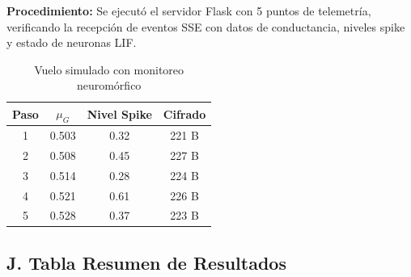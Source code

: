 \textbf{Procedimiento:} Se ejecutó el servidor Flask con 5 puntos de telemetría, verificando la recepción de eventos SSE con datos de conductancia, niveles spike y estado de neuronas LIF.

\begin{table}[H]
    \centering\footnotesize\setlength{\tabcolsep}{3pt}
    \caption{Vuelo simulado con monitoreo neuromórfico}
    \label{tab:flight-neuro}
    \begin{tabular}{|c|c|c|c|}
        \hline
        \textbf{Paso} & \textbf{$\mu_G$} & \textbf{Nivel Spike} & \textbf{Cifrado} \\
        \hline
        1 & 0.503 & 0.32 & 221 B \\
        2 & 0.508 & 0.45 & 227 B \\
        3 & 0.514 & 0.28 & 224 B \\
        4 & 0.521 & 0.61 & 226 B \\
        5 & 0.528 & 0.37 & 223 B \\
        \hline
    \end{tabular}
\end{table}

\subsection*{J. Tabla Resumen de Resultados}

\begin{table}[H]
    \centering\footnotesize\setlength{\tabcolsep}{3pt}
    \caption{Resumen de métricas del cifrado multicapa}
    \label{tab:summary-neuro}
\end{table}

